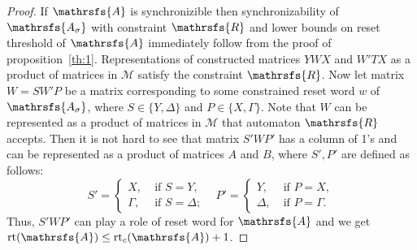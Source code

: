 \documentclass[11pt]{llncs}
\newcommand{\A}{\mathrsfs{A}}
\newcommand{\R}{\mathrsfs{R}}
\newcommand{\AD}{\mathrsfs{A_{\sigma}}}
\newcommand{\G}{\Gamma}
\newcommand{\D}{\Delta}
\newcommand{\rt}{\mathrm{rt}}
\newcommand{\rtc}{\mathrm{rt}_{c}}
\begin{document}
\begin{proof}
If $\A$ is synchronizible then synchronizability of $\AD$ with constraint $\R$ and lower bounds on reset threshold of $\A$ immediately 
follow from the proof of proposition~\ref{th:1}.
Representations of constructed matrices $YWX$ and $W'TX$ as a product of matrices in $\mathcal{M}$ satisfy the
constraint $\R$.
Now let matrix $W = SW'P$ be a matrix corresponding to some constrained reset word $w$ of $\AD$, where $S \in \{Y, \D\}$
and $P \in \{ X, \G\}$. Note that $W$ can be represented as a product of matrices in $\mathcal{M}$ that automaton $\R$ 
accepts.
Then it is not hard to see that matrix $S'WP'$ has a column of 1's and can be represented as
a product of matrices $A$ and $B$, where $S',P'$ are defined as follows:
$$
S' = 
\begin{cases}
X,\;& \mbox{if } S = Y,\\
\G,\;& \mbox{if } S = \D;
\end{cases}\;\;\;
P' = 
\begin{cases}
Y,\;& \mbox{if } P = X,\\
\D,\;& \mbox{if } P = \G.
\end{cases}
$$
Thus, $S'WP'$ can play a role of reset word for $\A$ and we get $\rt(\A) \leq \rtc(\A) + 1$.
\end{proof}
\end{document}

